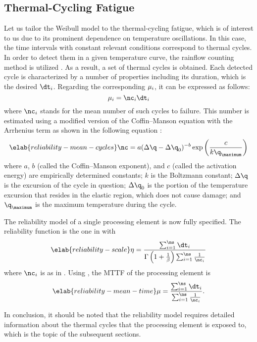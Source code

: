 \subsection{Thermal-Cycling Fatigue}

Let us tailor the Weibull model to the thermal-cycling fatigue, which is of
interest to us due to its prominent dependence on temperature oscillations. In
this case, the time intervals with constant relevant conditions correspond to
thermal cycles. In order to detect them in a given temperature curve, the
rainflow counting method is utilized \cite{xiang2010}. As a result, a set of \ns
thermal cycles is obtained. Each detected cycle is characterized by a number of
properties including its duration, which is the desired $\dt_i$. Regarding the
corresponding $\mu_i$, it can be expressed as follows:
\[
  \mean_i = \nc_i \dt_i
\]
where $\nc_i$ stands for the mean number of such cycles to failure. This number
is estimated using a modified version of the Coffin--Manson equation with the
Arrhenius term as shown in the following equation \cite{xiang2010, jedec2016}:
\begin{equation} \elab{reliability-mean-cycles}
  \nc = a (\Delta \q - \Delta \q_0)^{-b} \exp\left(\frac{c}{k \q_\maximum}\right)
\end{equation}
where $a$, $b$ (called the Coffin--Manson exponent), and $c$ (called the
activation energy) are empirically determined constants; $k$ is the Boltzmann
constant; $\Delta \q$ is the excursion of the cycle in question; $\Delta \q_0$
is the portion of the temperature excursion that resides in the elastic region,
which does not cause damage; and $\q_\maximum$ is the maximum temperature during
the cycle.

The reliability model of a single processing element is now fully specified. The
reliability function is the one in  with
\begin{equation} \elab{reliability-scale}
  \scale = \frac{\sum_{i = 1}^\ns \dt_i}{\Gamma\left(1 + \frac{1}{\shape}\right) \sum_{i = 1}^\ns \frac{1}{\nc_i}}
\end{equation}
where $\nc_i$ is as in . Using
, the \ac{MTTF} of the processing element is
\begin{equation} \elab{reliability-mean-time}
  \mean = \frac{\sum_{i = 1}^\ns \dt_i}{\sum_{i = 1}^\ns \frac{1}{\nc_i}}.
\end{equation}

In conclusion, it should be noted that the reliability model requires detailed
information about the thermal cycles that the processing element is exposed to,
which is the topic of the subsequent sections.
